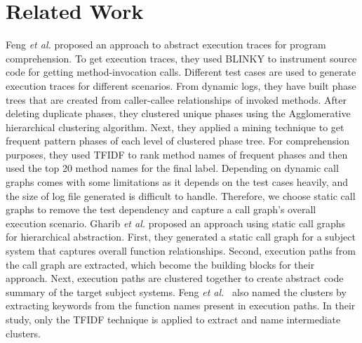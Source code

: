 \section{Related Work}
\label{relatedwork}
Feng \textit{et al.} \cite{feng2018hierarchicalExecutionComprehension} proposed an approach to abstract execution traces for program comprehension. To get execution traces, they used BLINKY to instrument source code for getting method-invocation calls. Different test cases are used to generate execution traces for different scenarios. From dynamic logs, they have built phase trees that are created from caller-callee relationships of invoked methods. After deleting duplicate phases, they clustered unique phases using the Agglomerative hierarchical clustering algorithm. Next, they applied a mining technique to get frequent pattern phases of each level of clustered phase tree. For comprehension purposes, they used TFIDF to rank method names of frequent phases and then used the top 20 method names for the final label. Depending on dynamic call graphs comes with some limitations as it depends on the test cases heavily, and the size of log file generated is difficult to handle. Therefore, we choose static call graphs to remove the test dependency and capture a call graph's overall execution scenario. Gharib \textit{et al.}  \cite{gharibi2018automaticStaticCluster} proposed an approach using static call graphs for hierarchical abstraction. First, they generated a static call graph for a subject system that captures overall function relationships. Second, execution paths from the call graph are extracted, which become the building blocks for their approach. Next, execution paths are clustered together to create abstract code summary of the target subject systems. Feng \textit{et al.}~\cite{feng2018hierarchicalExecutionComprehension} also named the clusters by extracting keywords from the function names present in execution paths. In their study, only the TFIDF technique is applied to extract and name intermediate clusters.


